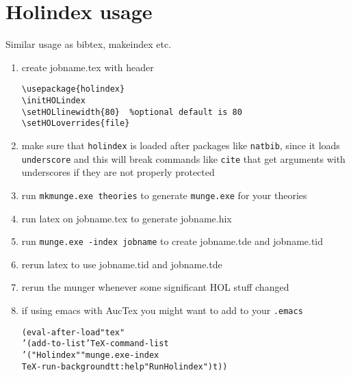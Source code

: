 \documentclass{article}
\begin{document}
\section{Holindex usage}

Similar usage as bibtex, makeindex etc.

\begin{enumerate}
\item create jobname.tex with header
\begin{verbatim}
\usepackage{holindex}
\initHOLindex
\setHOLlinewidth{80}  %optional default is 80
\setHOLoverrides{file}
\end{verbatim}
\item make sure that \texttt{holindex} is loaded after packages like
  \texttt{natbib}, since it loads \texttt{underscore} and this will
  break commands like \texttt{cite} that get arguments with
  underscores if they are not properly protected
\item run \texttt{mkmunge.exe theories} to generate \texttt{munge.exe}
  for your theories
\item run latex on jobname.tex to generate jobname.hix
\item run \texttt{munge.exe -index jobname} to create jobname.tde and jobname.tid
\item rerun latex to use jobname.tid and jobname.tde
\item rerun the munger whenever some significant HOL stuff changed
\item if using emacs with AucTex you might want to add to your \texttt{.emacs}
\begin{alltt}
(eval-after-load "tex"
  '(add-to-list 'TeX-command-list
    '("Holindex" "munge.exe -index %s" 
       TeX-run-background t t :help "Run Holindex") t))
\end{alltt}
\end{enumerate}
\end{document}
